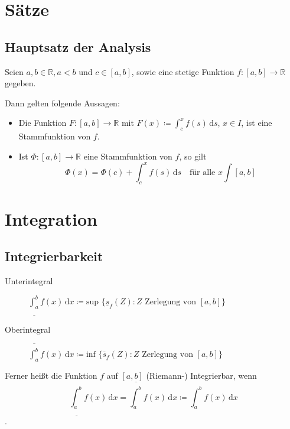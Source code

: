 \documentclass[a4paper, 11pt, accentcolor = tud3b]{tudreport}
\begin{document}
        \section{Sätze}
            \subsection{Hauptsatz der Analysis}
                Seien $ a, b \in \mathbb{R}, a < b $ und $ c \in [a, b] $, sowie eine stetige Funktion $ f : [a, b] \rightarrow \mathbb{R} $ gegeben.

                Dann gelten folgende Aussagen:
                \begin{itemize}
                    \item Die Funktion $ F : [a, b] \rightarrow \mathbb{R} $ mit $ F(x) \coloneqq \int _ c ^ x \! f(s) \, \mathrm{d}s $, $ x \in I $, ist eine Stammfunktion von $ f $.
                    \item Ist $ \Phi : [a, b] \rightarrow \mathbb{R} $ eine Stammfunktion von $ f $, so gilt \[ \Phi(x) = \Phi(c) + \int _ c ^ x \! f(s) \, \mathrm{d}s \quad\text{für alle } x \int [a, b] \]
                \end{itemize}

        \section{Integration}
            \subsection{Integrierbarkeit}
                \begin{description}
                    \item[Unterintegral] $ \underline{\int _ a ^ b} \! f(x) \, \mathrm{d}x \coloneqq \text{sup } \{ \underline{s} _ f (Z) : Z \text{ Zerlegung von } [a, b] \} $
                    \item[Oberintegral] $ \overline{\int _ a ^ b} \! f(x) \, \mathrm{d}x \coloneqq \text{inf } \{ \overline{s} _ f (Z) : Z \text{ Zerlegung von } [a, b] \} $
                \end{description}

                Ferner heißt die Funktion $ f $ auf $ [a, b] $ (Riemann-) Integrierbar, wenn \[ \underline{\int _ a ^ b} \! f(x) \, \mathrm{d}x = \overline{\int _ a ^ b} \! f(x) \, \mathrm{d}x \coloneqq \int _ a ^ b \! f(x) \, \mathrm{d}x \].
\end{document}
